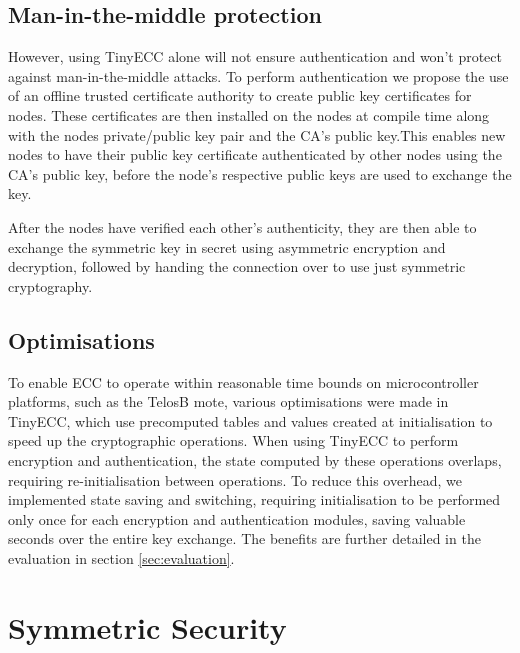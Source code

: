 \documentclass[conference]{./sty/IEEEtran}
\begin{document}
\subsection{Man-in-the-middle protection} %
\label{sub:man_in_the_middle_protection}

However, using TinyECC alone will not ensure authentication and won't protect against man-in-the-middle attacks. To perform authentication we propose the use of an offline trusted certificate authority to create public key certificates for nodes. These certificates are then installed on the nodes at compile time along with the nodes private/public key pair and the CA's public key.This enables new nodes to have their public key certificate authenticated by other nodes using the CA's public key, before the node's respective public keys are used to exchange the key.

After the nodes have verified each other's authenticity, they are then able to exchange the symmetric key in secret using asymmetric encryption and decryption, followed by handing the connection over to use just symmetric cryptography. 

\subsection{Optimisations} %
\label{sub:optimisations}

To enable ECC to operate within reasonable time bounds on microcontroller platforms, such as the TelosB mote, various optimisations were made in TinyECC, which use precomputed tables and values created at initialisation to speed up the cryptographic operations. When using TinyECC to perform encryption and authentication, the state computed by these operations overlaps, requiring re-initialisation between operations. To reduce this overhead, we implemented state saving and switching, requiring initialisation to be performed only once for each encryption and authentication modules, saving valuable seconds over the entire key exchange. The benefits are further detailed in the evaluation in section \ref{sec:evaluation}.

\section{Symmetric Security} %
\label{sec:symmetric_security}
\end{document}
